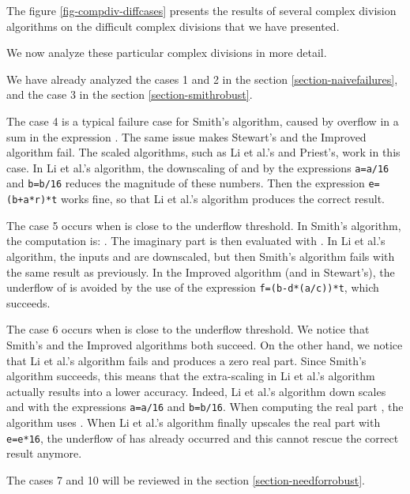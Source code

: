 \documentclass{paper}
\newcommand{\scivar}[1]{\texttt{#1}}
\begin{document}
The figure \ref{fig-compdiv-diffcases} presents the results of several complex division algorithms 
on the difficult complex divisions that we have presented.

We now analyze these particular complex divisions in more detail.

We have already analyzed the cases 1 and 2 in the section \ref{section-naivefailures}, 
and the case 3 in the section \ref{section-smithrobust}.

The case 4 is a typical failure case for Smith's algorithm,
caused by overflow in a sum in the expression . 
The same issue makes Stewart's and the Improved algorithm fail. 
The scaled algorithms, such as Li et al.'s and Priest's, work in this case. 
In Li et al.'s algorithm, the downscaling of  and  by the 
expressions \scivar{a=a/16} and \scivar{b=b/16} reduces the magnitude 
of these numbers. 
Then the expression \scivar{e=(b+a*r)*t} works fine, so that Li et al.'s 
algorithm produces the correct result.

The case 5 occurs when  is close to the underflow threshold. 
In Smith's algorithm, the computation is: . 
The imaginary part is then evaluated with 
. 
In Li et al.'s algorithm, the inputs  and  are downscaled, but then Smith's 
algorithm fails with the same result as previously. 
In the Improved algorithm (and in Stewart's), the underflow of  is avoided 
by the use of the expression \scivar{f=(b-d*(a/c))*t}, which succeeds.

The case 6 occurs when  is close to the underflow threshold. 
We notice that Smith's and the Improved algorithms both succeed. 
On the other hand, we notice that Li et al.'s algorithm fails and produces a 
zero real part. 
Since Smith's algorithm succeeds, this means that the extra-scaling 
in Li et al.'s algorithm actually results into a lower accuracy. 
Indeed, Li et al.'s algorithm down scales  and  with the expressions 
\scivar{a=a/16} and \scivar{b=b/16}. 
When computing the real part , the algorithm uses 
.
When Li et al.'s algorithm finally upscales the real part with \scivar{e=e*16}, the underflow 
of  has already occurred and this cannot rescue the correct result anymore. 

The cases 7 and 10 will be reviewed in the section \ref{section-needforrobust}.
\end{document}
